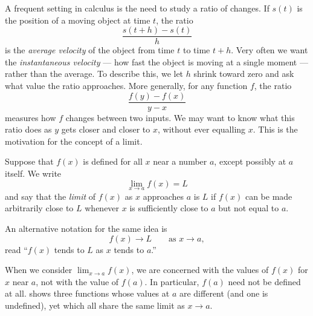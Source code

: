 A frequent setting in calculus is the need to study a ratio of changes. If \(s(t)\) is the position of a moving object at time \(t\), the ratio
\[
\frac{s(t + h) - s(t)}{h}
\]
is the \emph{average velocity} of the object from time \(t\) to time \(t + h\). Very often we want the \emph{instantaneous velocity} --- how fast the object is moving at a single moment --- rather than the average. To describe this, we let \(h\) shrink toward zero and ask what value the ratio approaches. More generally, for any function \(f\), the ratio
\[
\frac{f(y) - f(x)}{y - x}
\]
measures how \(f\) changes between two inputs. We may want to know what this ratio does as \(y\) gets closer and closer to \(x\), without ever equalling \(x\). This is the motivation for the concept of a limit.

\begin{definition}\label{def:limit-informal}
Suppose that \(f(x)\) is defined for all \(x\) near a number \(a\), except possibly at \(a\) itself. We write
\[
\lim_{x \to a} f(x) = L
\]
and say that the \emph{limit} of \(f(x)\) as \(x\) approaches \(a\) is \(L\) if \(f(x)\) can be made arbitrarily close to \(L\) whenever \(x\) is sufficiently close to \(a\) but not equal to \(a\).
\end{definition}

An alternative notation for the same idea is
\[
f(x) \to L \qquad \text{as } x \to a,
\]
read ``\(f(x)\) tends to \(L\) as \(x\) tends to \(a\).''

When we consider \(\lim_{x \to a} f(x)\), we are concerned with the values of \(f(x)\) for \(x\) near \(a\), not with the value of \(f(a)\). In particular, \(f(a)\) need not be defined at all.  shows three functions whose values at \(a\) are different (and one is undefined), yet which all share the same limit as \(x \to a\).

